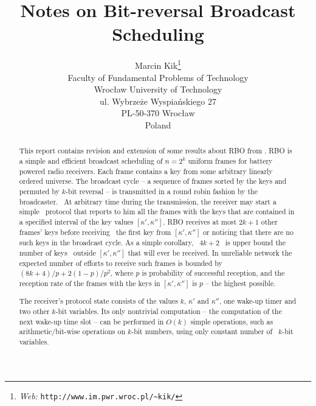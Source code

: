 \documentclass{article}
\newcommand{\homepage}[1]{{\textit{Web:} \texttt{#1}}}
\begin{document}
\title{Notes on Bit-reversal Broadcast Scheduling}\author{Marcin
Kik\thanks{\homepage{http://www.im.pwr.wroc.pl/\~{ }kik/}}\\
Faculty of Fundamental Problems of Technology\\
Wroc{\l}aw University of Technology\\
ul. Wybrze\.ze Wyspia\'nskiego 27\\
PL-50-370 Wroc{\l}aw\\
Poland}\maketitle

\begin{abstract}
  This report contains revision and extension of some results about RBO from
  {\cite{DBLP:journals/corr/abs-1108-5095}}.
  RBO is a simple and efficient broadcast scheduling of $n = 2^k$ uniform
  frames for battery powered radio receivers. Each frame contains a key from
  some arbitrary linearly ordered universe. The broadcast cycle -- a sequence
  of frames sorted by the keys and permuted by $k$-bit reversal -- is
  transmitted in a round robin fashion by the broadcaster. \ At arbitrary time
  during the transmission, the receiver may start a simple \ protocol that
  reports to him all the frames with the keys that are contained in a
  specified interval of the key values $[\kappa', \kappa'']$. RBO receives at
  most $2 k + 1$ other frames' keys before receiving \ the first key from
  $[\kappa', \kappa'']$ or noticing that there are no such keys in the
  broadcast cycle. As a simple corollary, \ $4 k + 2$ \ is upper bound the
  number of keys \ outside $[\kappa', \kappa'']$ that will ever be received.
  In unreliable network the expected number of efforts to receive such frames
  is bounded by $(8 k + 4) / p + 2 (1 - p) / p^2$, where $p$ is probability of
  successful reception, and the reception rate of the frames with the keys in
  $[\kappa', \kappa'']$ is $p$ -- the highest possible.
  
  The receiver's protocol state consists of the values $k$, $\kappa'$ and
  $\kappa''$, one wake-up timer and two other $k$-bit variables. Its only
  nontrivial computation -- the computation of the next wake-up time slot --
  can be performed in $O (k)$ simple operations, such as arithmetic/bit-wise
  operations on $k$-bit numbers, using only constant number of \ $k$-bit
  variables.
\end{abstract}
\end{document}
